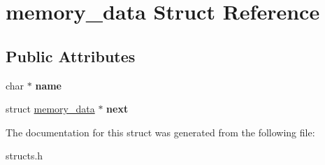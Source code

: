\hypertarget{structmemory__data}{\section{memory\-\_\-data Struct Reference}
\label{structmemory__data}
}
\subsection*{Public Attributes}
\begin{DoxyCompactItemize}
\item 
\hypertarget{structmemory__data_acf128d24cf05938665fd25f4b4472ec0}{char $\ast$ {\bfseries name}}\label{structmemory__data_acf128d24cf05938665fd25f4b4472ec0}

\item 
\hypertarget{structmemory__data_a065d90866d17949da35e51037de8fe6d}{struct \hyperlink{structmemory__data}{memory\-\_\-data} $\ast$ {\bfseries next}}\label{structmemory__data_a065d90866d17949da35e51037de8fe6d}

\end{DoxyCompactItemize}


The documentation for this struct was generated from the following file\-:\begin{DoxyCompactItemize}
\item 
structs.\-h\end{DoxyCompactItemize}
